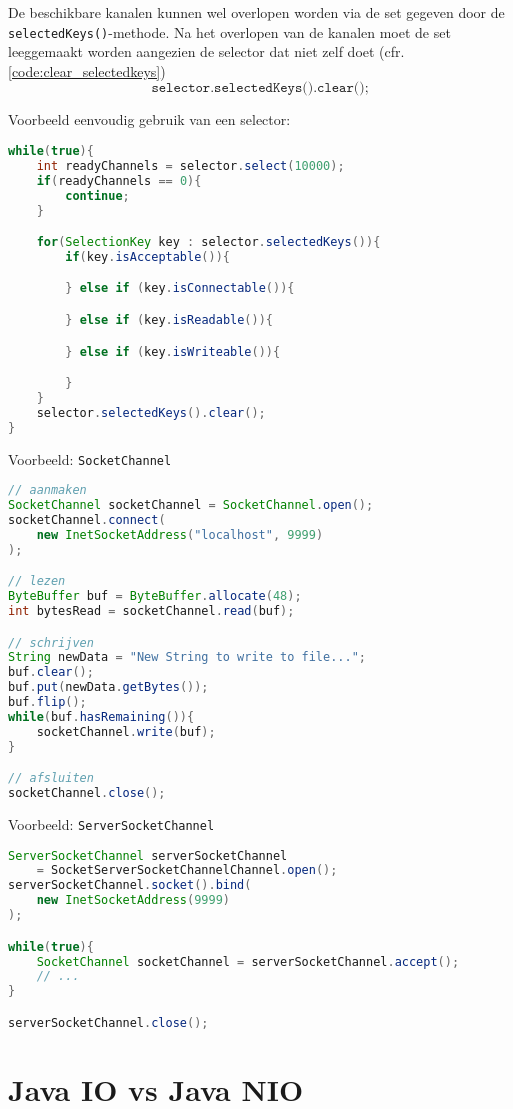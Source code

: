 \documentclass{report}
\begin{document}
De beschikbare kanalen kunnen wel overlopen worden via de set gegeven door de \texttt{selectedKeys()}-methode. Na het overlopen van de kanalen moet de set leeggemaakt worden aangezien de selector dat niet zelf doet (cfr. \ref{code:clear_selectedkeys})
\begin{equation}
	\texttt{selector.selectedKeys().clear();}
	\label{code:clear_selectedkeys}
\end{equation}

Voorbeeld eenvoudig gebruik van een selector:
\begin{lstlisting}[language=java]
while(true){
	int readyChannels = selector.select(10000);
	if(readyChannels == 0){ 
		continue; 
	}

	for(SelectionKey key : selector.selectedKeys()){
		if(key.isAcceptable()){

		} else if (key.isConnectable()){

		} else if (key.isReadable()){

		} else if (key.isWriteable()){

		}
	}
	selector.selectedKeys().clear();
}
\end{lstlisting}

Voorbeeld: \texttt{SocketChannel}
\begin{lstlisting}[language = java]
// aanmaken
SocketChannel socketChannel = SocketChannel.open();
socketChannel.connect(
	new InetSocketAddress("localhost", 9999)
);

// lezen
ByteBuffer buf = ByteBuffer.allocate(48);
int bytesRead = socketChannel.read(buf);

// schrijven
String newData = "New String to write to file...";
buf.clear();
buf.put(newData.getBytes());
buf.flip();
while(buf.hasRemaining()){
	socketChannel.write(buf);
}

// afsluiten
socketChannel.close();
\end{lstlisting}

Voorbeeld: \texttt{ServerSocketChannel}
\begin{lstlisting}[language = java]
ServerSocketChannel serverSocketChannel 
	= SocketServerSocketChannelChannel.open();
serverSocketChannel.socket().bind(
	new InetSocketAddress(9999)
);

while(true){
	SocketChannel socketChannel = serverSocketChannel.accept();
	// ...
}

serverSocketChannel.close();
\end{lstlisting}

\section{Java IO vs Java NIO}
\end{document}
